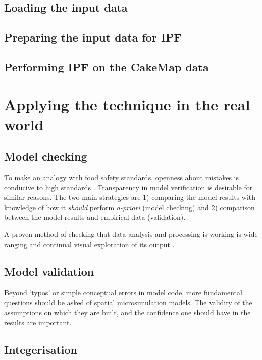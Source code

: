 \documentclass[a4paper, 11pt, twoside]{article}
\begin{document}
\subsection{Loading the input data}

\subsection{Preparing the input data for IPF}

\subsection{Performing IPF on the CakeMap data}

\section{Applying the technique in the real world} \label{smeval}

\subsection{Model checking}
To make an analogy with food safety standards, openness about mistakes is
conducive to high standards \citep{Powell2011}. Transparency in model
verification is desirable for similar reasons. The two main strategies are 1) 
comparing the model results with knowledge of how it \emph{should}
perform \emph{a-priori} (model checking) and 2) comparison between the model
results and empirical data (validation).

A proven method of checking that data analysis and processing is working
is wide ranging and continual visual exploration of its output
\citep{janert2010data}.

\subsection{Model validation}
\label{meval}
Beyond `typos' or simple conceptual errors in model code, more fundamental
questions should be asked of spatial microsimulation models. The validity
of the assumptions on which they are built, and the confidence one should have
in the results are important.

\subsection{Integerisation} 
\end{document}
